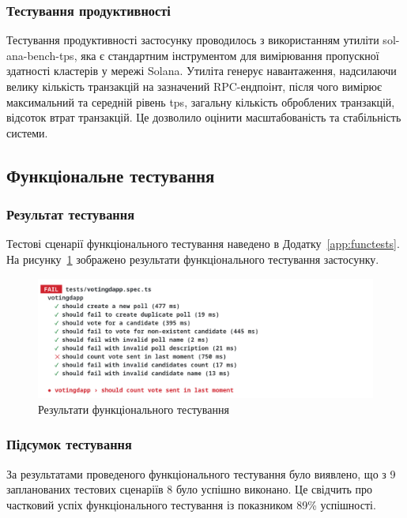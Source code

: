 \documentclass[14pt]{extreport}
\begin{document}
  \subsubsection{Тестування продуктивності}
  
  Тестування продуктивності застосунку проводилось з використанням утиліти sol-ana-bench-tps, яка є стандартним інструментом для вимірювання пропускної здатності кластерів у мережі Solana. Утиліта генерує навантаження, надсилаючи велику кількість транзакцій на зазначений RPC-ендпоінт, після чого вимірює максимальний та середній рівень \gls{tps}, загальну кількість оброблених транзакцій, відсоток втрат транзакцій. Це дозволило оцінити масштабованість та стабільність системи.
  
  \subsection{Функціональне тестування}
  
  \subsubsection*{Результат тестування}
  
  Тестові сценарії функціонального тестування наведено в Додатку~\ref{app:functests}. На рисунку~\ref{fig:functests} зображено результати функціонального тестування застосунку.

  \begin{figure}[H]
    \centering
    \includegraphics[width=\textwidth]{FuncTests}
    \caption{Результати функціонального тестування}
    \label{fig:functests}
  \end{figure}
  
  \subsubsection*{Підсумок тестування}
  
  За результатами проведеного функціонального тестування було виявлено, що з 9 запланованих тестових сценаріїв 8 було успішно виконано. Це свідчить про частковий успіх функціонального тестування із показником 89\% успішності.
  
\end{document}
